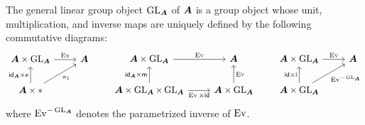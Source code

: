 \begin{proposition}
\label{proposition:gl-group-object}
The general linear group object $\operatorname{GL}_{\bm{A}}$ of ${\bm{A}}$ is a group object whose unit, multiplication, and inverse maps are uniquely defined by the following commutative diagrams:
\begin{equation*}
\begin{tikzcd}
{\A\times\GL_\A} & \A \\
{\A\times\*}
\arrow["\Ev", from=1-1, to=1-2]
\arrow["{\id_\A\times\e}", from=2-1, to=1-1]
\arrow["{\pi_1}"', from=2-1, to=1-2]
\end{tikzcd}\qquad
\begin{tikzcd}
{\A\times\GL_\A} & \A \\
{\A\times\GL_\A\times\GL_\A} & {\A\times\GL_\A}
\arrow["\Ev", from=1-1, to=1-2]
\arrow["{\id_\A\times\m}", from=2-1, to=1-1]
\arrow["{\Ev\times\id}"', from=2-1, to=2-2]
\arrow["\Ev"', from=2-2, to=1-2]
\end{tikzcd}\qquad
\begin{tikzcd}
{\A\times\GL_\A} & \A \\
{\A\times\GL_\A}
\arrow["\Ev", from=1-1, to=1-2]
\arrow["{\id\times\i}", from=2-1, to=1-1]
\arrow["{\Ev^{-\GL_\A}}"', from=2-1, to=1-2]
\end{tikzcd}
\end{equation*}
where $\operatorname{Ev}^{-\operatorname{GL}_{\bm{A}}}$ denotes the parametrized inverse of $\operatorname{Ev}$.
\end{proposition}
